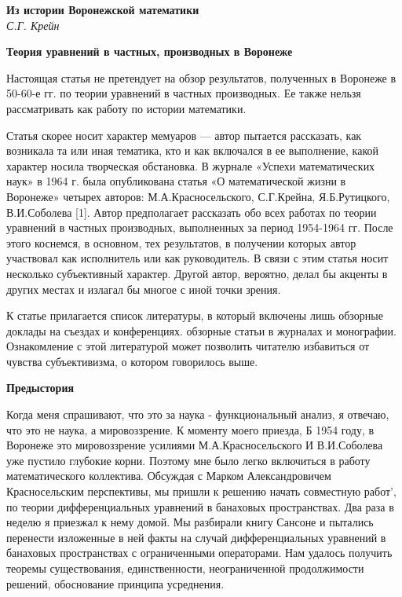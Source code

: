 \begin{center}{ \bf Из истории Воронежской математики}\\
{\it С.Г. Крейн} \\
\end{center}

{ \bf Теория уравнений в частных, производных в Воронеже}

Настоящая статья не претендует на обзор результатов, полученных в Воронеже в 50-60-е гг. по теории уравнений в частных производных. Ее также нельзя рассматривать как работу по истории математики.

Статья скорее носит характер мемуаров — автор пытается рассказать, как возникала та или иная тематика, кто и как включался в ее выполнение, какой характер носила творческая обстановка. В журнале «Успехи математических наук» в 1964 г. была опубликована статья «О математической жизни в Воронеже» четырех авторов: М.А.Красносельского, С.Г.Крейна, Я.Б.Рутицкого, В.И.Соболева [1]. Автор предполагает рассказать обо всех работах по теории уравнений в частных производных, выполненных за период 1954-1964 гг. После этого коснемся, в основном, тех результатов, в получении которых автор участвовал как исполнитель или как руководитель. В связи с этим статья носит несколько субъективный характер. Другой автор, вероятно, делал бы акценты в других местах и излагал бы многое с иной точки зрения.

К статье прилагается список литературы, в который включены лишь обзорные доклады на съездах и конференциях. обзорные статьи в журналах и монографии. Ознакомление с этой литературой может позволить читателю избавиться от чувства субъективизма, о котором говорилось выше.

{\bf Предыстория}

Когда меня спрашивают, что это за наука - функциональный анализ, я отвечаю, что это не наука, а мировоззрение. К моменту моего приезда, Б 1954 году, в Воронеже это мировоззрение усилиями М.А.Красносельского И В.И.Соболева уже пустило глубокие корни. Поэтому мне было легко включиться в работу математического коллектива. Обсуждая с Марком Александровичем Красносельским перспективы, мы пришли к решению начать совместную работ', по теории дифференциальных уравнений в банаховых пространствах. Два раза в неделю я приезжал к нему домой. Мы разбирали книгу Сансоне и пытались
перенести изложенные в ней факты на случай дифференциальных уравнений в банаховых пространствах с ограниченными операторами. Нам удалось получить теоремы существования, единственности, неограниченной продолжимости решений, обоснование принципа усреднения.

